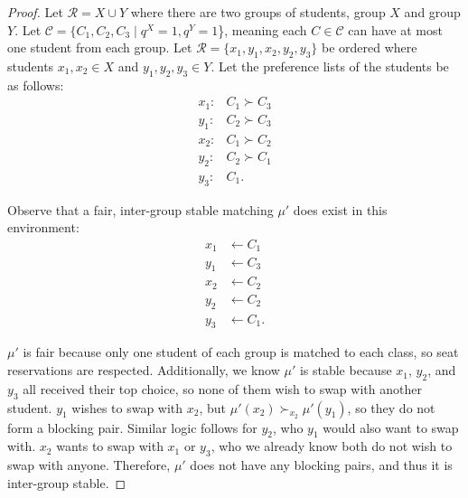 \begin{proof}
  Let $\mathcal{R} = X \cup Y$ where there are two groups of students, group $X$
  and group $Y$. Let  $\mathcal{C} = \{ C_1, C_2, C_3 \mid q^X = 1, q^Y =
  1$\}, meaning each $C \in \mathcal{C}$ can have at most one student from each
  group. Let $\mathcal{R} = \{x_1, y_1, x_2, y_2, y_3\}$ be ordered where students $x_1, x_2 \in X$ and
  $y_1, y_2, y_3 \in Y$. Let the preference lists of the students be as follows: \[
    \begin{array}{ll} x_1: & C_1 \succ C_3 \\ y_1: &
             C_2 \succ C_3             \\ x_2: & C_1 \succ C_2\\ y_2: & C_2 \succ
                C_1 \\ y_3: & C_1.

    \end{array}
  \] 

  Observe that a fair, inter-group stable matching $\mu'$ does exist in this
  environment: \[ 
    \begin{array}{ll}
      x_1 &\gets C_1 \\ 
      y_1 &\gets C_3 \\
      x_2 &\gets C_2 \\
      y_2 &\gets C_2 \\
      y_3 &\gets C_1.
    \end{array}
\]

  $\mu'$ is fair because only one student of each group is matched to each class,
  so seat reservations are respected. Additionally, we know $\mu'$ is stable
  because $x_1$, $y_2$, and $y_3$ all received their top
  choice, so none of them wish to swap with another student. $y_1$
  wishes to swap with $x_2$, but $\mu'(x_2) \succ_{x_2} \mu'(y_1)$, so they do
  not form a blocking pair. Similar logic follows for $y_2$, who $y_1$ would
  also want to swap with. $x_2$ wants to swap with $x_1$ or $y_3$, who we
  already know both do not wish to swap with anyone. Therefore, $\mu'$ does not have any
  blocking pairs, and thus it is inter-group stable.


\end{proof}
